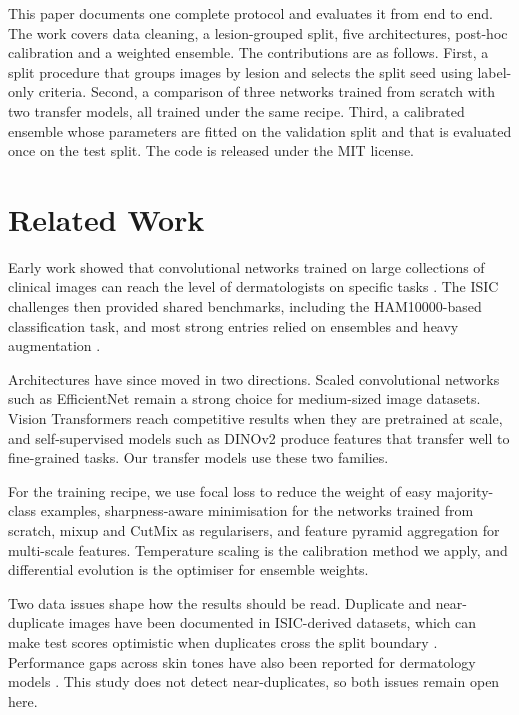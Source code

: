 \documentclass[10pt,twocolumn]{article}
\begin{document}
This paper documents one complete protocol and evaluates it from end to end. The work covers data cleaning, a lesion-grouped split, five architectures, post-hoc calibration and a weighted ensemble. The contributions are as follows. First, a split procedure that groups images by lesion and selects the split seed using label-only criteria. Second, a comparison of three networks trained from scratch with two transfer models, all trained under the same recipe. Third, a calibrated ensemble whose parameters are fitted on the validation split and that is evaluated once on the test split. The code is released under the MIT license.

\section{Related Work}
\label{sec:related}

Early work showed that convolutional networks trained on large collections of clinical images can reach the level of dermatologists on specific tasks \cite{esteva2017dermatologist}. The ISIC challenges then provided shared benchmarks, including the HAM10000-based classification task, and most strong entries relied on ensembles and heavy augmentation \cite{codella2019isic}.

Architectures have since moved in two directions. Scaled convolutional networks such as EfficientNet \cite{tan2019efficientnet} remain a strong choice for medium-sized image datasets. Vision Transformers \cite{dosovitskiy2021vit} reach competitive results when they are pretrained at scale, and self-supervised models such as DINOv2 \cite{oquab2024dinov2} produce features that transfer well to fine-grained tasks. Our transfer models use these two families.

For the training recipe, we use focal loss \cite{lin2017focal} to reduce the weight of easy majority-class examples, sharpness-aware minimisation \cite{foret2021sam} for the networks trained from scratch, mixup and CutMix \cite{zhang2018mixup} as regularisers, and feature pyramid aggregation \cite{lin2017fpn} for multi-scale features. Temperature scaling \cite{guo2017calibration} is the calibration method we apply, and differential evolution \cite{storn1997differential} is the optimiser for ensemble weights.

Two data issues shape how the results should be read. Duplicate and near-duplicate images have been documented in ISIC-derived datasets, which can make test scores optimistic when duplicates cross the split boundary \cite{cassidy2022,abhishek2024}. Performance gaps across skin tones have also been reported for dermatology models \cite{daneshjou2022}. This study does not detect near-duplicates, so both issues remain open here.
\end{document}
